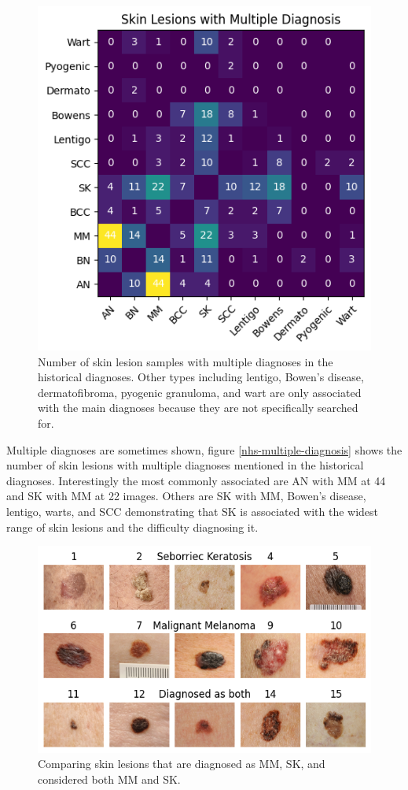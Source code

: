 \begin{figure}
    \centering
    \includegraphics[scale=0.75]{images/nhs/nhs-multiple-diagnosis.png}
    \caption{Number of skin lesion samples with multiple diagnoses in the historical diagnoses. Other types including lentigo, Bowen's disease, dermatofibroma, pyogenic granuloma, and wart are only associated with the main diagnoses because they are not specifically searched for.} 
\end{figure}\label{nhs-multiple-diagnosis}

Multiple diagnoses are sometimes shown, figure \ref{nhs-multiple-diagnosis} shows the number of skin lesions with multiple diagnoses mentioned in the historical diagnoses. Interestingly the most commonly associated are AN with MM at 44 and SK with MM at 22 images. Others are SK with MM, Bowen's disease, lentigo, warts, and SCC demonstrating that SK is associated with the widest range of skin lesions and the difficulty diagnosing it.

\begin{figure}
    \centering
    \includegraphics[scale=0.75]{images/nhs/nhs-mm-sk-examples.png}
    \caption{Comparing skin lesions that are diagnosed as MM, SK, and considered both MM and SK.} 
\end{figure}\label{nhs-mm-sk-examples}

